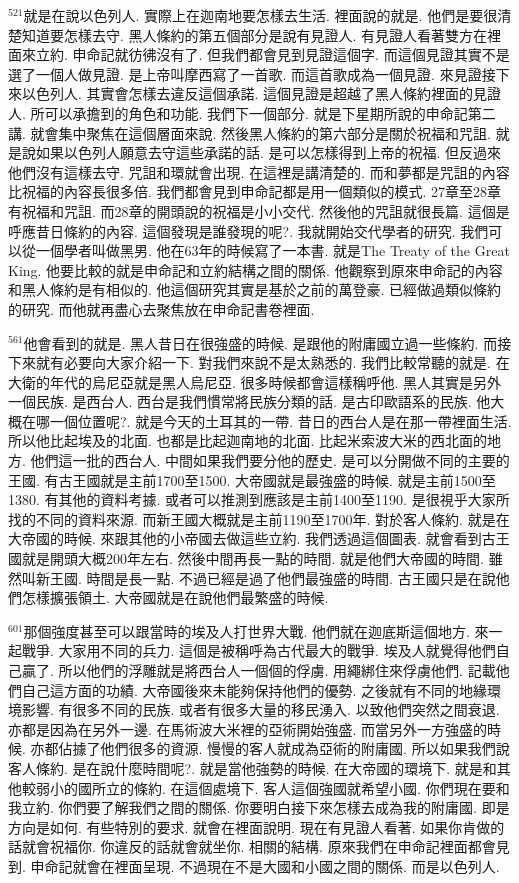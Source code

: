\documentclass{book}
\begin{document}
$^{521}$就是在說以色列人.
實際上在迦南地要怎樣去生活.
裡面說的就是.
他們是要很清楚知道要怎樣去守.
黑人條約的第五個部分是說有見證人.
有見證人看著雙方在裡面來立約.
申命記就彷彿沒有了.
但我們都會見到見證這個字.
而這個見證其實不是選了一個人做見證.
是上帝叫摩西寫了一首歌.
而這首歌成為一個見證.
來見證接下來以色列人.
其實會怎樣去違反這個承諾.
這個見證是超越了黑人條約裡面的見證人.
所可以承擔到的角色和功能.
我們下一個部分.
就是下星期所說的申命記第二講.
就會集中聚焦在這個層面來說.
然後黑人條約的第六部分是關於祝福和咒詛.
就是說如果以色列人願意去守這些承諾的話.
是可以怎樣得到上帝的祝福.
但反過來他們沒有這樣去守.
咒詛和環就會出現.
在這裡是講清楚的.
而和夢都是咒詛的內容比祝福的內容長很多倍.
我們都會見到申命記都是用一個類似的模式.
27章至28章有祝福和咒詛.
而28章的開頭說的祝福是小小交代.
然後他的咒詛就很長篇.
這個是呼應昔日條約的內容.
這個發現是誰發現的呢?.
我就開始交代學者的研究.
我們可以從一個學者叫做黑男.
他在63年的時候寫了一本書.
就是The Treaty of the Great King.
他要比較的就是申命記和立約結構之間的關係.
他觀察到原來申命記的內容和黑人條約是有相似的.
他這個研究其實是基於之前的萬登豪.
已經做過類似條約的研究.
而他就再盡心去聚焦放在申命記書卷裡面.

$^{561}$他會看到的就是.
黑人昔日在很強盛的時候.
是跟他的附庸國立過一些條約.
而接下來就有必要向大家介紹一下.
對我們來說不是太熟悉的.
我們比較常聽的就是.
在大衛的年代的烏尼亞就是黑人烏尼亞.
很多時候都會這樣稱呼他.
黑人其實是另外一個民族.
是西台人.
西台是我們慣常將民族分類的話.
是古印歐語系的民族.
他大概在哪一個位置呢?.
就是今天的土耳其的一帶.
昔日的西台人是在那一帶裡面生活.
所以他比起埃及的北面.
也都是比起迦南地的北面.
比起米索波大米的西北面的地方.
他們這一批的西台人.
中間如果我們要分他的歷史.
是可以分開做不同的主要的王國.
有古王國就是主前1700至1500.
大帝國就是最強盛的時候.
就是主前1500至1380.
有其他的資料考據.
或者可以推測到應該是主前1400至1190.
是很視乎大家所找的不同的資料來源.
而新王國大概就是主前1190至1700年.
對於客人條約.
就是在大帝國的時候.
來跟其他的小帝國去做這些立約.
我們透過這個圖表.
就會看到古王國就是開頭大概200年左右.
然後中間再長一點的時間.
就是他們大帝國的時間.
雖然叫新王國.
時間是長一點.
不過已經是過了他們最強盛的時間.
古王國只是在說他們怎樣擴張領土.
大帝國就是在說他們最繁盛的時候.

$^{601}$那個強度甚至可以跟當時的埃及人打世界大戰.
他們就在迦底斯這個地方.
來一起戰爭.
大家用不同的兵力.
這個是被稱呼為古代最大的戰爭.
埃及人就覺得他們自己贏了.
所以他們的浮雕就是將西台人一個個的俘虜.
用繩綁住來俘虜他們.
記載他們自己這方面的功績.
大帝國後來未能夠保持他們的優勢.
之後就有不同的地緣環境影響.
有很多不同的民族.
或者有很多大量的移民湧入.
以致他們突然之間衰退.
亦都是因為在另外一邊.
在馬術波大米裡的亞術開始強盛.
而當另外一方強盛的時候.
亦都佔據了他們很多的資源.
慢慢的客人就成為亞術的附庸國.
所以如果我們說客人條約.
是在說什麼時間呢?.
就是當他強勢的時候.
在大帝國的環境下.
就是和其他較弱小的國所立的條約.
在這個處境下.
客人這個強國就希望小國.
你們現在要和我立約.
你們要了解我們之間的關係.
你要明白接下來怎樣去成為我的附庸國.
即是方向是如何.
有些特別的要求.
就會在裡面說明.
現在有見證人看著.
如果你肯做的話就會祝福你.
你違反的話就會就坐你.
相關的結構.
原來我們在申命記裡面都會見到.
申命記就會在裡面呈現.
不過現在不是大國和小國之間的關係.
而是以色列人.
\end{document}
